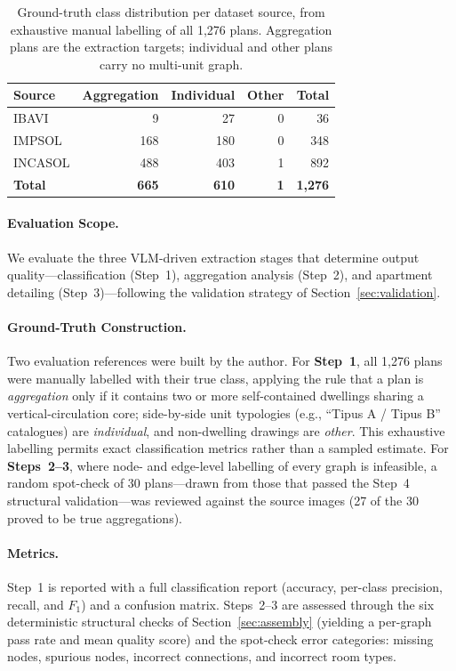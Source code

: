 \documentclass[12pt,a4paper,openright]{report}
\begin{document}
\begin{table}[ht]
\centering
\begin{tabular}{@{}lrrrr@{}}
\toprule
\textbf{Source} & \textbf{Aggregation} & \textbf{Individual} & \textbf{Other} & \textbf{Total} \\
\midrule
IBAVI   &   9 &  27 & 0 &   36 \\
IMPSOL  & 168 & 180 & 0 &  348 \\
INCASOL & 488 & 403 & 1 &  892 \\
\midrule
\textbf{Total} & \textbf{665} & \textbf{610} & \textbf{1} & \textbf{1{,}276} \\
\bottomrule
\end{tabular}
\caption{Ground-truth class distribution per dataset source, from exhaustive
manual labelling of all 1{,}276 plans. Aggregation plans are the extraction
targets; individual and other plans carry no multi-unit graph.}
\label{tab:dataset-dist}
\end{table}

\paragraph{Evaluation Scope.} We evaluate the three VLM-driven extraction stages that determine output quality---classification (Step~1), aggregation analysis (Step~2), and apartment detailing (Step~3)---following the validation strategy of Section~\ref{sec:validation}.

\paragraph{Ground-Truth Construction.} Two evaluation references were built by the author. For \textbf{Step~1}, all 1{,}276 plans were manually labelled with their true class, applying the rule that a plan is \textit{aggregation} only if it contains two or more self-contained dwellings sharing a vertical-circulation core; side-by-side unit typologies (e.g., ``Tipus A / Tipus B'' catalogues) are
\textit{individual}, and non-dwelling drawings are \textit{other}. This exhaustive labelling permits exact classification metrics rather than a sampled estimate. For \textbf{Steps~2--3}, where node- and edge-level labelling of every graph is infeasible, a random spot-check of 30 plans---drawn from those that passed the Step~4 structural validation---was reviewed against the source images (27 of the 30 proved to be true aggregations).


\paragraph{Metrics.} Step~1 is reported with a full classification report (accuracy, per-class precision, recall, and $F_1$) and a confusion matrix. 
Steps~2--3 are assessed through the six deterministic structural checks of Section~\ref{sec:assembly} (yielding a per-graph pass rate and mean quality score) and the spot-check error categories: missing nodes, spurious nodes, incorrect connections, and incorrect room types.
\end{document}
